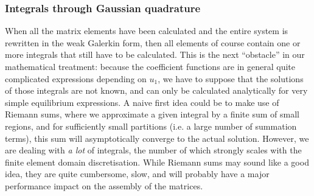 \subsubsection{Integrals through Gaussian quadrature}
When all the matrix elements have been calculated and the entire system is rewritten in the weak Galerkin form, then all elements of course contain one or more integrals that still have to be calculated. This is the next ``obstacle'' in our mathematical treatment: because the coefficient functions are in general quite complicated expressions depending on $u_1$, we have to suppose that the solutions of those integrals are not known, and can only be calculated analytically for very simple equilibrium expressions. A naive first idea could be to make use of Riemann sums, where we approximate a given integral by a finite sum of small regions, and for sufficiently small partitions (i.e. a large number of summation terms), this sum will asymptotically converge to the actual solution. However, we are dealing with \emph{a lot} of integrals, the number of which strongly scales with the finite element domain discretisation. While Riemann sums may sound like a good idea, they are quite cumbersome, slow, and will probably have a major performance impact on the assembly of the matrices.

